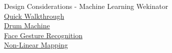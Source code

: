 \documentclass{beamer}
\begin{document}
\begin{frame}{Design Considerations - Machine Learning}
    Wekinator\\
    \vspace{5mm}
    \href{https://www.youtube.com/watch?v=dPV-gCqy9j4}{Quick Walkthrough}\\
    \href{https://www.youtube.com/watch?v=NKyyBAKrQgE}{Drum Machine}\\
    \href{ https://www.youtube.com/watch?v=tcQpnV4ajLY}{Face Gesture Recognition}\\
    \href{https://www.youtube.com/watch?v=_mTiXmTGkog}{Non-Linear Mapping}\\
\end{frame}
\end{document}
